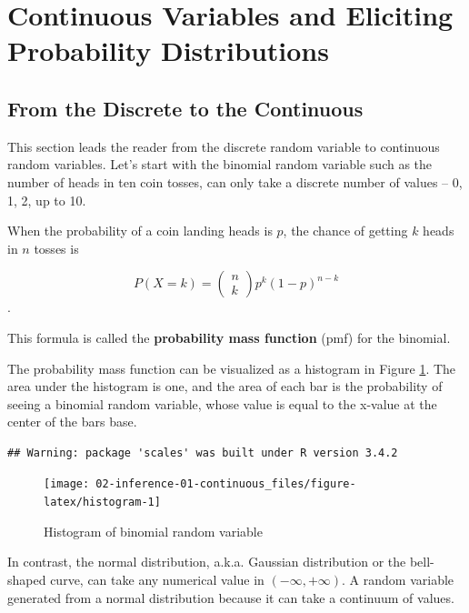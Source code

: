 \documentclass[]{book}
\theoremstyle{definition}
\theoremstyle{definition}
\theoremstyle{definition}
\theoremstyle{remark}
\begin{document}
\section{Continuous Variables and Eliciting Probability
Distributions}\label{continuous-variables-and-eliciting-probability-distributions}

\subsection{From the Discrete to the
Continuous}\label{from-the-discrete-to-the-continuous}

This section leads the reader from the discrete random variable to
continuous random variables. Let's start with the binomial random
variable such as the number of heads in ten coin tosses, can only take a
discrete number of values -- 0, 1, 2, up to 10.

When the probability of a coin landing heads is \(p\), the chance of
getting \(k\) heads in \(n\) tosses is

\[P(X = k) = \left( \begin{array}{c} n \\ k \end{array} \right) p^k (1-p)^{n-k}\].

This formula is called the \textbf{probability mass function} (pmf) for
the binomial.

The probability mass function can be visualized as a histogram in Figure
\ref{fig:histogram}. The area under the histogram is one, and the area
of each bar is the probability of seeing a binomial random variable,
whose value is equal to the x-value at the center of the bars base.

\begin{verbatim}
## Warning: package 'scales' was built under R version 3.4.2
\end{verbatim}

\begin{figure}

{\centering \texttt{[image: 02-inference-01-continuous\_files/figure-latex/histogram-1]} 

}

\caption{Histogram of binomial random variable}\label{fig:histogram}
\end{figure}

In contrast, the normal distribution, a.k.a. Gaussian distribution or
the bell-shaped curve, can take any numerical value in
\((-\infty,+\infty)\). A random variable generated from a normal
distribution because it can take a continuum of values.
\end{document}
